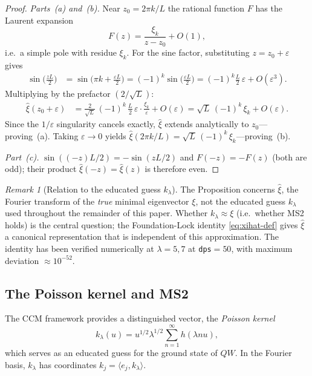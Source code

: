 \documentclass[12pt,a4paper]{article}
\theoremstyle{definition}
\theoremstyle{remark}
\newtheorem{remark}[theorem]{Remark}
\newcommand{\ip}[2]{\langle #1, #2 \rangle}
\begin{document}
\begin{proof}
\textit{Parts~(a) and~(b).}
Near $z_0 = 2\pi k / L$ the rational function $F$ has the Laurent expansion
\[
  F(z) = \frac{\xi_k}{z - z_0} + O(1),
\]
i.e.\ a simple pole with residue $\xi_k$.  For the sine factor, substituting
$z = z_0 + \varepsilon$ gives
\begin{align*}
  \sin\!\bigl(\tfrac{zL}{2}\bigr)
  &= \sin\!\bigl(\pi k + \tfrac{\varepsilon L}{2}\bigr)
   = (-1)^k \sin\!\bigl(\tfrac{\varepsilon L}{2}\bigr)
   = (-1)^k \tfrac{L}{2}\,\varepsilon + O(\varepsilon^3).
\end{align*}
Multiplying by the prefactor $(2/\sqrt{L})$:
\begin{align*}
  \hat{\xi}(z_0 + \varepsilon)
  &= \frac{2}{\sqrt{L}}\,(-1)^k\,\frac{L}{2}\,\varepsilon
     \cdot \frac{\xi_k}{\varepsilon} + O(\varepsilon)
   = \sqrt{L}\,(-1)^k\,\xi_k + O(\varepsilon).
\end{align*}
Since the $1/\varepsilon$ singularity cancels exactly, $\hat{\xi}$ extends
analytically to $z_0$---proving~(a).  Taking $\varepsilon \to 0$ yields
$\hat{\xi}(2\pi k/L) = \sqrt{L}\,(-1)^k\,\xi_k$---proving~(b).

\textit{Part~(c).}
$\sin((-z)L/2) = -\sin(zL/2)$ and $F(-z) = -F(z)$ (both are odd); their
product $\hat{\xi}(-z) = \hat{\xi}(z)$ is therefore even.
\end{proof}

\begin{remark}[Relation to the educated guess $k_\lambda$]
\label{rem:xihat-vs-klambda}
The Proposition concerns $\hat{\xi}$, the Fourier transform of the
\emph{true} minimal eigenvector $\xi$, not the educated guess $k_\lambda$
used throughout the remainder of this paper.  Whether $k_\lambda\approx\xi$
(i.e.\ whether MS2 holds) is the central question; the Foundation-Lock
identity \eqref{eq:xihat-def} gives $\hat{\xi}$ a canonical representation that is
independent of this approximation.  The identity has been verified
numerically at $\lambda=5, 7$ at \texttt{dps}$=50$, with maximum
deviation $\approx 10^{-52}$.
\end{remark}

\subsection{The Poisson kernel and MS2}

The CCM framework provides a distinguished vector, the
\emph{Poisson kernel}
\begin{equation}
\label{eq:poisson}
k_\lambda(u) = u^{1/2} \lambda^{1/2} \sum_{n=1}^\infty h(\lambda n u),
\end{equation}
which serves as an educated guess for the ground state of $QW$.
In the Fourier basis, $k_\lambda$ has coordinates $k_j = \ip{e_j}{k_\lambda}$.
\end{document}
